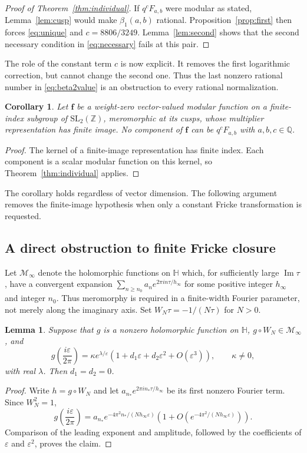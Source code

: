 \documentclass[11pt,reqno]{amsart}
\newcommand{\QQ}{\mathbb Q}
\newcommand{\ZZ}{\mathbb Z}
\newcommand{\HH}{\mathbb H}
\newtheorem{lemma}[theorem]{Lemma}
\newtheorem{corollary}[theorem]{Corollary}
\theoremstyle{remark}
\numberwithin{equation}{section}
\begin{document}
\begin{proof}[Proof of Theorem~\ref{thm:individual}]
If $q^cF_{a,b}$ were modular as stated, Lemma~\ref{lem:cusp}
would make $\beta_1(a,b)$ rational. Proposition~\ref{prop:first}
then forces \eqref{eq:unique} and $c=8806/3249$.
Lemma~\ref{lem:second} shows that the second necessary condition
in \eqref{eq:necessary} fails at this pair.
\end{proof}

The role of the constant term $c$ is now explicit. It removes the
first logarithmic correction, but cannot change the second one.
Thus the last nonzero rational number in \eqref{eq:beta2value}
is an obstruction to every rational normalization.


\begin{corollary}\label{cor:vector}
Let $\mathbf f$ be a weight-zero vector-valued modular function on a
finite-index subgroup of $\mathrm{SL}_2(\ZZ)$, meromorphic at its cusps,
whose multiplier representation has finite image. No component of
$\mathbf f$ can be $q^cF_{a,b}$ with $a,b,c\in\QQ$.
\end{corollary}
\begin{proof}
The kernel of a finite-image representation has finite index. Each
component is a scalar modular function on this kernel, so
Theorem~\ref{thm:individual} applies.
\end{proof}


The corollary holds regardless of vector dimension. The following
argument removes the finite-image hypothesis when only a constant
Fricke transformation is requested.

\subsection{A direct obstruction to finite Fricke closure}
Let $\mathcal M_\infty$ denote the holomorphic functions on $\HH$ which,
for sufficiently large $\operatorname{Im}\tau$, have a convergent
expansion $\sum_{n\geq n_0}a_n e^{2\pi i n\tau/h_\infty}$ for some positive
integer $h_\infty$ and integer $n_0$. Thus meromorphy is required in a
finite-width Fourier parameter, not merely along the imaginary axis.
Set $W_N\tau=-1/(N\tau)$ for $N>0$.

\begin{lemma}\label{lem:fricke-radial}
Suppose that $g$ is a nonzero holomorphic function on $\HH$,
$g\circ W_N\in\mathcal M_\infty$, and
\[
 g\left(\frac{i\varepsilon}{2\pi}\right)
 =\kappa e^{\lambda/\varepsilon}
 (1+d_1\varepsilon+d_2\varepsilon^2+O(\varepsilon^3)),
 \qquad \kappa\ne0,
\]
with real $\lambda$. Then $d_1=d_2=0$.
\end{lemma}
\begin{proof}
Write $h=g\circ W_N$ and let $a_{n_*}e^{2\pi i n_*\tau/h_\infty}$
be its first nonzero Fourier term. Since $W_N^2=1$,
\[
 g\left(\frac{i\varepsilon}{2\pi}\right)
 =a_{n_*}e^{-4\pi^2 n_*/(Nh_\infty\varepsilon)}
 \left(1+O(e^{-4\pi^2/(Nh_\infty\varepsilon)})\right).
\]
Comparison of the leading exponent and amplitude, followed by the
coefficients of $\varepsilon$ and $\varepsilon^2$, proves the claim.
\end{proof}
\end{document}
